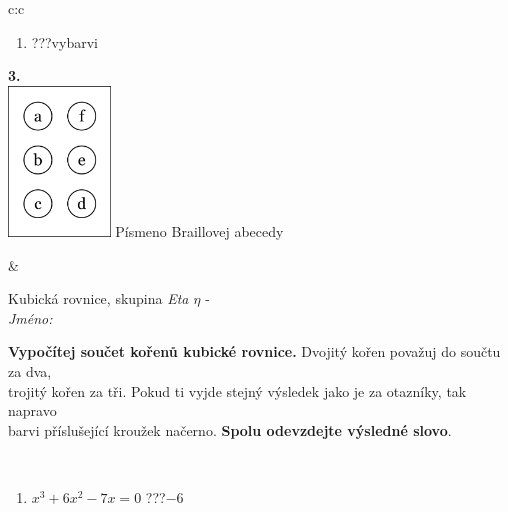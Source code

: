 \documentclass[10pt]{report}
\begin{document}
\begin{tabular}{c:c}
\begin{minipage}[c][104.5mm][t]{0.5\linewidth}
\begin{center}
\begin{minipage}{0.79\linewidth}
\begin{center}
\begin{varwidth}{\linewidth}
\begin{enumerate}
\item \quad \dotfill\; ???\;\dotfill \quad vybarvi
\end{enumerate}
\end{varwidth}
\end{center}
\end{minipage}
\begin{minipage}{0.20\linewidth}
\begin{center}
{\Huge\bfseries 3.} \\[2mm]
\includegraphics[height=40mm]{../images/braille.png}
{\small Písmeno Braillovej abecedy}
\end{center}
\end{minipage}
\end{center}
\end{minipage}
&
\begin{minipage}[c][104.5mm][t]{0.5\linewidth}
\begin{center}
\vspace{7mm}
{\huge Kubická rovnice, skupina \textit{Eta $\eta$} -}\\[5mm]
\textit{Jméno:}\phantom{xxxxxxxxxxxxxxxxxxxxxxxxxxxxxxxxxxxxxxxxxxxxxxxxxxxxxxxxxxxxxxxxx}\\[5mm]
\begin{minipage}{0.95\linewidth}
\begin{center}
\textbf{Vypočítej součet kořenů kubické rovnice.} Dvojitý kořen považuj do součtu za dva,\\trojitý kořen za tři. Pokud ti vyjde stejný výsledek jako je za otazníky, tak napravo\\barvi příslušející kroužek načerno. \textbf{Spolu odevzdejte výsledné slovo}.
\end{center}
\end{minipage}
\\[1mm]
\begin{minipage}{0.79\linewidth}
\begin{center}
\begin{varwidth}{\linewidth}
\begin{enumerate}
\Large
\item $x^3+6x^2-7x=0$\quad \dotfill\; ???\;\dotfill \quad $-6$

\end{enumerate}
\end{varwidth}
\end{center}
\end{minipage}
\end{center}
\end{minipage}
\end{tabular}
\end{document}
